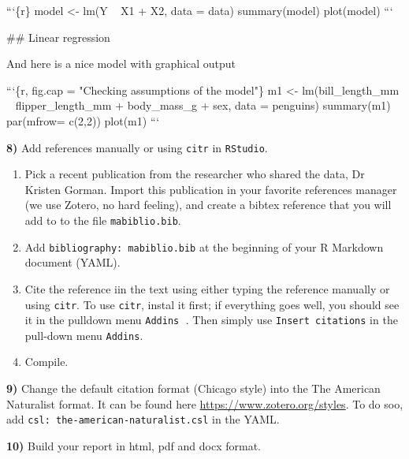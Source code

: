 \documentclass[
  12pt,
]{book}
\newenvironment{Shaded}{\begin{snugshade}}{\end{snugshade}}
\newcommand{\BaseNTok}[1]{\textcolor[rgb]{0.00,0.00,0.81}{#1}}
\newcommand{\FunctionTok}[1]{\textcolor[rgb]{0.00,0.00,0.00}{#1}}
\newcommand{\NormalTok}[1]{#1}
\providecommand{\tightlist}{%
  \setlength{\itemsep}{0pt}\setlength{\parskip}{0pt}}
\begin{document}
\begin{Shaded}
\begin{Highlighting}[]
\BaseNTok{```\{r\}}
\BaseNTok{model <- lm(Y ~  X1 + X2, data = data)}
\BaseNTok{summary(model)}
\BaseNTok{plot(model)}
\BaseNTok{```}
\end{Highlighting}
\end{Shaded}

\begin{Shaded}
\begin{Highlighting}[]
\FunctionTok{## Linear regression}

\NormalTok{And here is a nice model with graphical output}

\BaseNTok{```\{r, fig.cap = "Checking assumptions of the model"\}}
\BaseNTok{m1 <- lm(bill_length_mm ~  flipper_length_mm + body_mass_g + sex, data = penguins)}
\BaseNTok{summary(m1)}
\BaseNTok{par(mfrow= c(2,2))}
\BaseNTok{plot(m1)}
\BaseNTok{```}
\end{Highlighting}
\end{Shaded}

\textbf{8)} Add references manually or using \texttt{citr} in \texttt{RStudio}.

\begin{enumerate}
\def\labelenumi{\arabic{enumi}.}
\tightlist
\item
  Pick a recent publication from the researcher who shared the data, Dr Kristen Gorman. Import this publication in your favorite references manager (we use Zotero, no hard feeling), and create a bibtex reference that you will add to to the file \texttt{mabiblio.bib}.
\item
  Add \texttt{bibliography:\ mabiblio.bib} at the beginning of your R Markdown document (YAML).
\item
  Cite the reference iin the text using either typing the reference manually or using \texttt{citr}. To use \texttt{citr}, instal it first; if everything goes well, you should see it in the pulldown menu \texttt{Addins} 💪. Then simply use \texttt{Insert\ citations} in the pull-down menu \texttt{Addins}.
\item
  Compile.
\end{enumerate}

\textbf{9)} Change the default citation format (Chicago style) into the The American Naturalist format. It can be found here \url{https://www.zotero.org/styles}. To do soo, add \texttt{csl:\ the-american-naturalist.csl} in the YAML.

\textbf{10)} Build your report in html, pdf and docx format. 🎉
\end{document}
